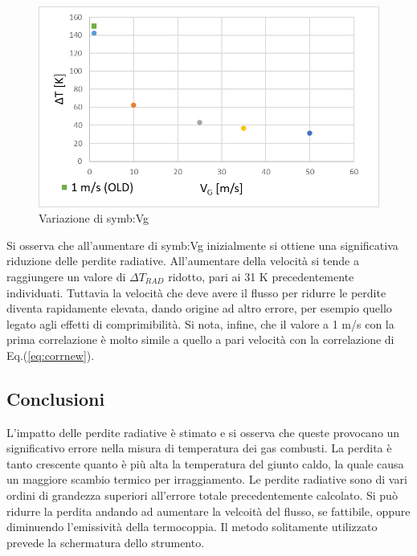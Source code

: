 \begin{figure}[H]
	\centering
	\includegraphics[width=0.7\linewidth]{"../sperimentazione nei propulsori/varV"}
	\caption{Variazione di \gls{symb:Vg}}
	\label{fig:varv}
\end{figure}

Si osserva che all'aumentare di \gls{symb:Vg} inizialmente si ottiene una significativa riduzione delle perdite radiative. All'aumentare della velocità si tende a raggiungere un valore di $\Delta T_{\textit{RAD}}$ ridotto, pari ai 31 K precedentemente individuati. Tuttavia la velocità che deve avere il flusso per ridurre le perdite diventa rapidamente elevata, dando origine ad altro errore, per esempio quello legato agli effetti di comprimibilità. Si nota, infine, che il valore a 1 m/s con la prima correlazione è molto simile a quello a pari velocità con la correlazione di Eq.(\ref{eq:corrnew}).

\subsection{Conclusioni}
L'impatto delle perdite radiative è stimato e si osserva che queste provocano un significativo errore nella misura di temperatura dei gas combusti. La perdita è tanto crescente quanto è più alta la temperatura del giunto caldo, la quale causa un maggiore scambio termico per irraggiamento. Le perdite radiative sono di vari ordini di grandezza superiori all'errore totale precedentemente calcolato. Si può ridurre la perdita andando ad aumentare la velcoità del flusso, se fattibile, oppure diminuendo l'emissività della termocoppia. Il metodo solitamente utilizzato prevede la schermatura dello strumento. 